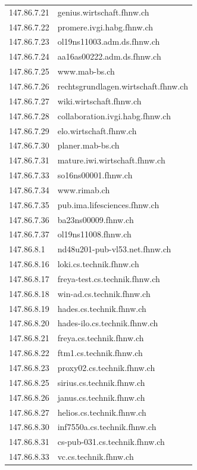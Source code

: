 \documentclass[a4paper,11pt]{scrartcl}
\begin{document}
\begin{longtable}{p{2.5cm}|p{7cm}}
	147.86.7.21 & genius.wirtschaft.fhnw.ch \\ 
	147.86.7.22 & promere.ivgi.habg.fhnw.ch \\ 
	147.86.7.23 & ol19ns11003.adm.ds.fhnw.ch \\ 
	147.86.7.24 & aa16as00222.adm.ds.fhnw.ch \\ 
	147.86.7.25 & www.mab-bs.ch \\ 
	147.86.7.26 & rechtsgrundlagen.wirtschaft.fhnw.ch \\ 
	147.86.7.27 & wiki.wirtschaft.fhnw.ch \\ 
	147.86.7.28 & collaboration.ivgi.habg.fhnw.ch \\ 
	147.86.7.29 & elo.wirtschaft.fhnw.ch \\ 
	147.86.7.30 & planer.mab-bs.ch \\ 
	147.86.7.31 & mature.iwi.wirtschaft.fhnw.ch \\ 
	147.86.7.33 & so16ns00001.fhnw.ch \\ 
	147.86.7.34 & www.rimab.ch \\ 
	147.86.7.35 & pub.ima.lifesciences.fhnw.ch \\ 
	147.86.7.36 & ba23ns00009.fhnw.ch \\ 
	147.86.7.37 & ol19ns11008.fhnw.ch \\ 
	147.86.8.1 & nd48u201-pub-vl53.net.fhnw.ch \\ 
	147.86.8.16 & loki.cs.technik.fhnw.ch \\ 
	147.86.8.17 & freya-test.cs.technik.fhnw.ch \\ 
	147.86.8.18 & win-ad.cs.technik.fhnw.ch \\ 
	147.86.8.19 & hades.cs.technik.fhnw.ch \\ 
	147.86.8.20 & hades-ilo.cs.technik.fhnw.ch \\ 
	147.86.8.21 & freya.cs.technik.fhnw.ch \\ 
	147.86.8.22 & ftm1.cs.technik.fhnw.ch \\ 
	147.86.8.23 & proxy02.cs.technik.fhnw.ch \\ 
	147.86.8.25 & sirius.cs.technik.fhnw.ch \\ 
	147.86.8.26 & janus.cs.technik.fhnw.ch \\ 
	147.86.8.27 & helios.cs.technik.fhnw.ch \\ 
	147.86.8.30 & inf7550a.cs.technik.fhnw.ch \\ 
	147.86.8.31 & cs-pub-031.cs.technik.fhnw.ch \\ 
	147.86.8.33 & vc.cs.technik.fhnw.ch \\ 

\end{longtable}
\end{document}
